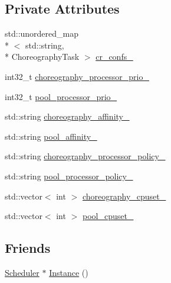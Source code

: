 \subsection*{Private Attributes}
\begin{DoxyCompactItemize}
\item 
std\-::unordered\-\_\-map\\*
$<$ std\-::string, \\*
Choreography\-Task $>$ \hyperlink{classapollo_1_1cyber_1_1scheduler_1_1SchedulerChoreography_a3100523cc34d5580b47edfb0522f41e5}{cr\-\_\-confs\-\_\-}
\item 
int32\-\_\-t \hyperlink{classapollo_1_1cyber_1_1scheduler_1_1SchedulerChoreography_a45208ca2d21e7cd6dcd93ca2da154cf5}{choreography\-\_\-processor\-\_\-prio\-\_\-}
\item 
int32\-\_\-t \hyperlink{classapollo_1_1cyber_1_1scheduler_1_1SchedulerChoreography_a7914b4df5ee5649eafed83731ef5d4cd}{pool\-\_\-processor\-\_\-prio\-\_\-}
\item 
std\-::string \hyperlink{classapollo_1_1cyber_1_1scheduler_1_1SchedulerChoreography_aec49efce9726f395b7693523d90e7e75}{choreography\-\_\-affinity\-\_\-}
\item 
std\-::string \hyperlink{classapollo_1_1cyber_1_1scheduler_1_1SchedulerChoreography_ae1de0347c7ca14747605710ada094138}{pool\-\_\-affinity\-\_\-}
\item 
std\-::string \hyperlink{classapollo_1_1cyber_1_1scheduler_1_1SchedulerChoreography_afef4e6579d5243141ccfe5a0a93e4d63}{choreography\-\_\-processor\-\_\-policy\-\_\-}
\item 
std\-::string \hyperlink{classapollo_1_1cyber_1_1scheduler_1_1SchedulerChoreography_a9b191db22dbd0ce253ac37faa2407585}{pool\-\_\-processor\-\_\-policy\-\_\-}
\item 
std\-::vector$<$ int $>$ \hyperlink{classapollo_1_1cyber_1_1scheduler_1_1SchedulerChoreography_aba359e389e80b01a60e4d55633793cdd}{choreography\-\_\-cpuset\-\_\-}
\item 
std\-::vector$<$ int $>$ \hyperlink{classapollo_1_1cyber_1_1scheduler_1_1SchedulerChoreography_a5a5d905d92f6bcd94aa7b703cc7075db}{pool\-\_\-cpuset\-\_\-}
\end{DoxyCompactItemize}
\subsection*{Friends}
\begin{DoxyCompactItemize}
\item 
\hyperlink{classapollo_1_1cyber_1_1scheduler_1_1Scheduler}{Scheduler} $\ast$ \hyperlink{classapollo_1_1cyber_1_1scheduler_1_1SchedulerChoreography_a2ea2bb1f09fecdd726f87c09b726461e}{Instance} ()
\end{DoxyCompactItemize}
